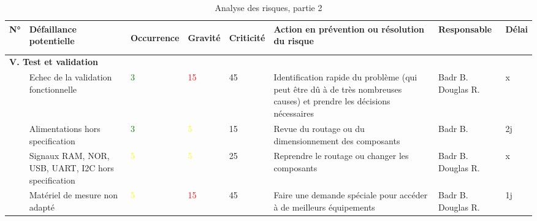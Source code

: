 \begin{sidewaystable}[H]
  \centering
  \begingroup{}
  \def\tabularxcolumn#1{m{#1}}
  
    \begin{tabularx}{\textwidth}{|p{1cm}|X|p{0.5cm}|p{0.5cm}|p{0.5cm}|X|p{2cm}|p{1cm}|}
    \hline
	\rowcolor[HTML]{ACCCEA}     
    N°    & Défaillance potentielle & \begin{sideways}Occurrence\end{sideways} & \begin{sideways}Gravité\end{sideways} & \begin{sideways}Criticité\end{sideways} & Action en prévention ou résolution du risque & Responsable & Délai \\
    \hline
 \multicolumn{8}{|l|}{\textbf{V. Test et validation}} \\ \hline
          & Echec de la validation fonctionnelle & \textcolor{green}{3}     & \textcolor{red}{15}    & 45     & Identification rapide du problème
(qui peut être dû à de très nombreuses causes)
et prendre les décisions nécessaires & Badr B.
Douglas R. & x \\ \hline
          & Alimentations hors specification & \textcolor{green}{3}     & \textcolor{yellow}{5}     & 15      & Revue du routage ou du dimensionnement des composants & Badr B. & 2j \\ \hline
          & Signaux RAM, NOR, USB, UART, I2C hors specification & \textcolor{yellow}{5}     & \textcolor{yellow}{5}     & 25      & Reprendre le routage ou changer les composants & Badr B.
Douglas R. & x \\ \hline
          & Matériel de mesure non adapté & \textcolor{yellow}{5}     & \textcolor{red}{15}    & 45       & Faire une demande spéciale pour
accéder à de meilleurs équipements & Badr B.
Douglas R. & 1j \\ \hline
    \end{tabularx}%
  \endgroup{}
    
  \caption{Analyse des risques, partie 2}    
\end{sidewaystable}%
